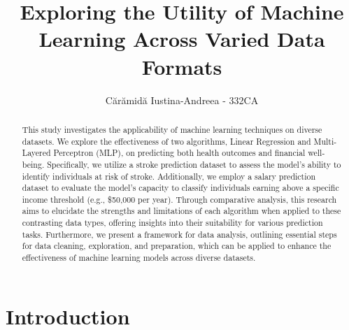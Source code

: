 \documentclass[runningheads]{paper}
\begin{document}
%
\title{Exploring the Utility of Machine Learning Across Varied Data Formats}
%
\author{Cărămidă Iustina-Andreea - 332CA}
%
%
\maketitle              %
%
\begin{abstract}
    This study investigates the applicability of machine learning techniques on 
    diverse datasets. We explore the effectiveness of two algorithms, Linear 
    Regression and Multi-Layered Perceptron (MLP), on predicting both health 
    outcomes and financial well-being. Specifically, we utilize a stroke 
    prediction dataset to assess the model's ability to identify individuals at 
    risk of stroke. Additionally, we employ a salary prediction dataset to 
    evaluate the model's capacity to classify individuals earning above a 
    specific income threshold (e.g., \$50,000 per year). Through comparative 
    analysis, this research aims to elucidate the strengths and limitations of 
    each algorithm when applied to these contrasting data types, offering 
    insights into their suitability for various prediction tasks. Furthermore, 
    we present a framework for data analysis, outlining essential steps for data
    cleaning, exploration, and preparation, which can be applied to enhance the 
    effectiveness of machine learning models across diverse datasets.


\end{abstract}
\section{Introduction}
\end{document}
